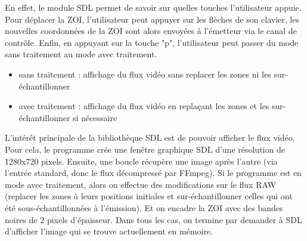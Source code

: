 \documentclass[11pt,a4paper]{article}
\begin{document}
\bigbreak
En effet, le module SDL permet de savoir sur quelles touches l'utilisateur appuie. 
Pour déplacer la ZOI, l'utilisateur peut appuyer sur les flèches de son clavier, les nouvelles coordonnées de la ZOI sont alors envoyées à l'émetteur via le canal de contrôle.
Enfin, en appuyant sur la touche "p", l'utilisateur peut passer du mode sans traitement au mode avec traitement.

\bigbreak
\begin{itemize}
\item{sans traitement : affichage du flux vidéo sans replacer les zones ni les sur-échantillonner}
\item{avec traitement : affichage du flux vidéo en replaçant les zones et les sur-échantillonner si nécessaire}
\end{itemize}

\bigbreak
L'intérêt principale de la bibliothèque SDL est de pouvoir afficher le flux vidéo.
Pour cela, le programme crée une fenêtre graphique SDL d'une résolution de 1280x720 pixels.
Ensuite, une boucle récupère une image après l'autre (via l'entrée standard, donc le flux décompressé par FFmpeg).
Si le programme est en mode avec traitement, alors on effectue des modifications sur le flux RAW (replacer les zones à leurs positions initiales et sur-échantillonner celles qui ont été sous-échantillonnées à l'émission). 
Et on encadre la ZOI avec des bandes noires de 2 pixels d'épaisseur.
Dans tous les cas, on termine par demander à SDL d'afficher l'image qui se trouve actuellement en mémoire.
\end{document}

